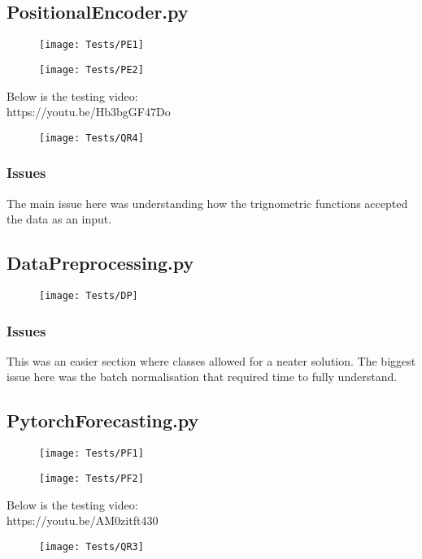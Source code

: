 \documentclass{article}
\begin{document}
\subsection{PositionalEncoder.py}
\begin{figure}[H]
    \centering
    \texttt{[image: Tests/PE1]}
\end{figure}
\begin{figure}[H]
    \centering
    \texttt{[image: Tests/PE2]}
\end{figure}
Below is the testing video:\\
https://youtu.be/Hb3bgGF47Do
\begin{figure}[H]
    \centering
    \texttt{[image: Tests/QR4]}
\end{figure}

\subsubsection{Issues}
The main issue here was understanding how the trignometric functions accepted
the data as an input.
\subsection{DataPreprocessing.py}

\begin{figure}[H]
    \centering
    \texttt{[image: Tests/DP]}
\end{figure}

\clearpage
\subsubsection{Issues}
This was an easier section where classes allowed for a neater solution. The biggest
issue here was the batch normalisation that required time to fully understand.

\subsection{PytorchForecasting.py}
\begin{figure}[H]
    \centering
    \texttt{[image: Tests/PF1]}
\end{figure}
\begin{figure}[H]
    \centering
    \texttt{[image: Tests/PF2]}
\end{figure}
Below is the testing video:
\\https://youtu.be/AM0zitft430
\begin{figure}[H]
    \centering
    \texttt{[image: Tests/QR3]}
\end{figure}
\end{document}
